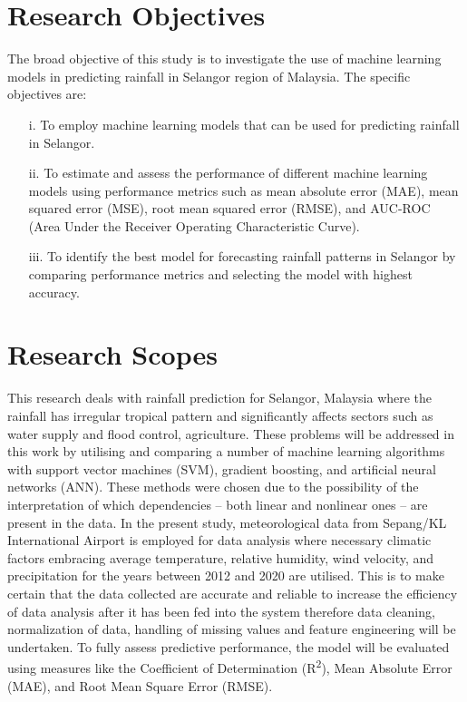 \documentclass[12pt]{article}
\begin{document}
\section{Research Objectives}
\label{sec:research_objectives}
The broad objective of this study is to investigate the use of machine learning models in predicting rainfall in Selangor region of Malaysia. The specific objectives are:
\begin{itemize}
    \item[i.] To employ machine learning models that can be used for predicting rainfall in Selangor.
    \item[ii.] To estimate and assess the performance of different machine learning models using performance metrics such as mean absolute error (MAE), mean squared error (MSE), root mean squared error (RMSE), and AUC-ROC (Area Under the Receiver Operating Characteristic Curve).
    \item[iii.] To identify the best model for forecasting rainfall patterns in Selangor by comparing performance metrics and selecting the model with highest accuracy.
\end{itemize}

\section{Research Scopes}
\label{sec:research_scopes}
This research deals with rainfall prediction for Selangor, Malaysia where the rainfall has irregular tropical pattern and significantly affects sectors such as water supply and flood control, agriculture. These problems will be addressed in this work by utilising and comparing a number of machine learning algorithms with support vector machines (SVM), gradient boosting, and artificial neural networks (ANN). These methods were chosen due to the possibility of the interpretation of which dependencies – both linear and nonlinear ones – are present in the data. In the present study, meteorological data from Sepang/KL International Airport is employed for data analysis where necessary climatic factors embracing average temperature, relative humidity, wind velocity, and precipitation for the years between 2012 and 2020 are utilised. This is to make certain that the data collected are accurate and reliable to increase the efficiency of data analysis after it has been fed into the system therefore data cleaning, normalization of data, handling of missing values and feature engineering will be undertaken. To fully assess predictive performance, the model will be evaluated using measures like the Coefficient of Determination (R\textsuperscript{2}), Mean Absolute Error (MAE), and Root Mean Square Error (RMSE).
\end{document}
